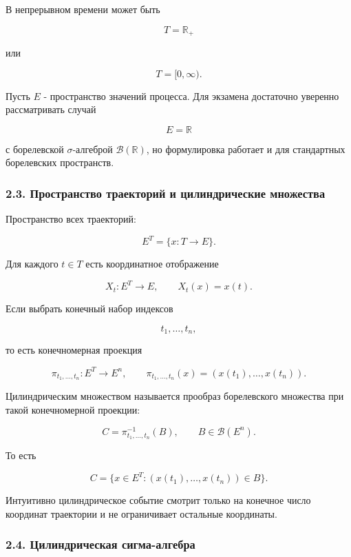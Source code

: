 \documentclass[
  11pt,
  a4paper,
]{article}
\begin{document}
В непрерывном времени может быть

\[
T=\mathbb R_+
\]

или

\[
T=[0,\infty).
\]

Пусть \(E\) - пространство значений процесса. Для экзамена достаточно
уверенно рассматривать случай

\[
E=\mathbb R
\]

с борелевской \(\sigma\)-алгеброй \(\mathcal B(\mathbb R)\), но
формулировка работает и для стандартных борелевских пространств.

\subsubsection{2.3. Пространство траекторий и цилиндрические
множества}\label{ux43fux440ux43eux441ux442ux440ux430ux43dux441ux442ux432ux43e-ux442ux440ux430ux435ux43aux442ux43eux440ux438ux439-ux438-ux446ux438ux43bux438ux43dux434ux440ux438ux447ux435ux441ux43aux438ux435-ux43cux43dux43eux436ux435ux441ux442ux432ux430}

Пространство всех траекторий:

\[
E^T=\{x:T\to E\}.
\]

Для каждого \(t\in T\) есть координатное отображение

\[
X_t:E^T\to E,
\qquad
X_t(x)=x(t).
\]

Если выбрать конечный набор индексов

\[
t_1,\ldots,t_n,
\]

то есть конечномерная проекция

\[
\pi_{t_1,\ldots,t_n}:E^T\to E^n,
\qquad
\pi_{t_1,\ldots,t_n}(x)=(x(t_1),\ldots,x(t_n)).
\]

Цилиндрическим множеством называется прообраз борелевского множества при
такой конечномерной проекции:

\[
C=\pi_{t_1,\ldots,t_n}^{-1}(B),
\qquad
B\in\mathcal B(E^n).
\]

То есть

\[
C=\{x\in E^T:(x(t_1),\ldots,x(t_n))\in B\}.
\]

Интуитивно цилиндрическое событие смотрит только на конечное число
координат траектории и не ограничивает остальные координаты.

\subsubsection{2.4. Цилиндрическая
сигма-алгебра}\label{ux446ux438ux43bux438ux43dux434ux440ux438ux447ux435ux441ux43aux430ux44f-ux441ux438ux433ux43cux430-ux430ux43bux433ux435ux431ux440ux430}
\end{document}
